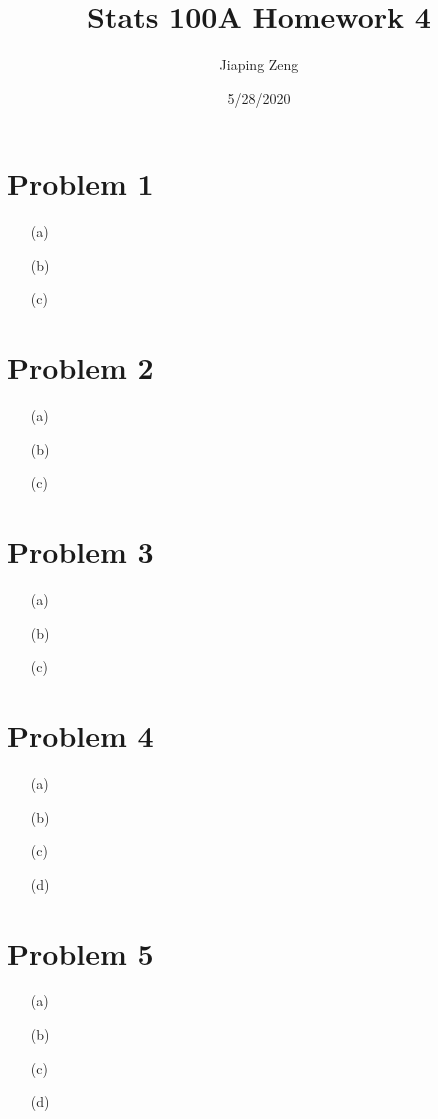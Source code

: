 \documentclass{article}
\title{Stats 100A Homework 4}
\author{Jiaping Zeng}
\date{5/28/2020}
\begin{document}
\maketitle

\section*{Problem 1}
\begin{itemize}
	\item [(a)]
	\item [(b)]
	\item [(c)]
\end{itemize}

\section*{Problem 2}
\begin{itemize}
	\item [(a)]
	\item [(b)]
	\item [(c)]
\end{itemize}

\section*{Problem 3}
\begin{itemize}
	\item [(a)]
	\item [(b)]
	\item [(c)]
\end{itemize}

\section*{Problem 4}
\begin{itemize}
	\item [(a)]
	\item [(b)]
	\item [(c)]
	\item [(d)]
\end{itemize}

\section*{Problem 5}
\begin{itemize}
	\item [(a)]
	\item [(b)]
	\item [(c)]
	\item [(d)]
\end{itemize}
\end{document}
